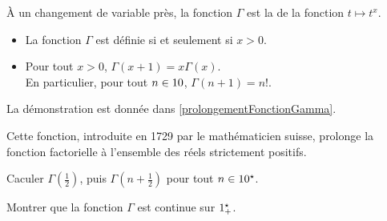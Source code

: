 \begin{remarque}
    À un changement de variable près, la fonction $\Gamma$ est la  de la fonction $t \mapsto t^x$. 
\end{remarque} 

\begin{prop}{}
    \begin{itemize}
        \item La fonction $\Gamma$ est définie si et seulement si $x>0$.
        \item Pour tout $x > 0$, $\Gamma(x+1) = x\Gamma(x)$. \\
        En particulier, pour tout $n \in 10$, $\Gamma(n+1) = n!$. 
    \end{itemize}
\end{prop}

La démonstration est donnée dans \ref{prolongementFonctionGamma}.

Cette fonction, introduite en 1729 par le mathématicien suisse, prolonge la fonction factorielle à l'ensemble des réels strictement positifs.

\begin{exercice}
    Caculer $\Gamma \left( \frac{1}{2} \right)$, puis $\Gamma \left( n + \frac{1}{2} \right)$ pour tout $n \in 10^\star$.
\end{exercice}


\begin{exercice}
    Montrer que la fonction $\Gamma$ est continue sur $1^\star_+$.
\end{exercice}

